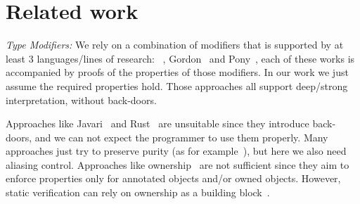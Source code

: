 
\saveSpace
\section{Related work}
\label{s:related}
\saveSpace

\noindent\textit{Type Modifiers:}
We rely on a combination of modifiers that is supported by at least 3 languages/lines of research:
~\cite{ServettoZucca15,ServettoEtAl13a,JOT:issue_2011_01/article1,GianniniEtAl16},
Gordon~\cite{GordonEtAl12}
and Pony~\cite{clebsch2015deny,clebsch2017orca},
each of these works is accompanied by proofs of the properties of those modifiers.
In our work we just assume the required properties hold.
 Those approaches all support deep/strong interpretation, without back-doors.

Approaches like Javari~\cite{TschantzErnst05,Boyland06} and Rust~\cite{matsakis2014rust}
are unsuitable since they introduce back-doors, and we can not expect the programmer to use them properly.
Many approaches just try to preserve purity (as for example~\cite{pearce2011jpure}),
but here we also need aliasing control.
Approaches like ownership~\cite{ClarkeEtAl13,ZibinEtAl10,DietlEtAl07}
are not sufficient since they aim to enforce properties only for
annotated objects and/or owned objects.
However, static verification can rely on ownership as a building block~\cite{%
muller2002modular,%
barnett2011specification%
}.%






